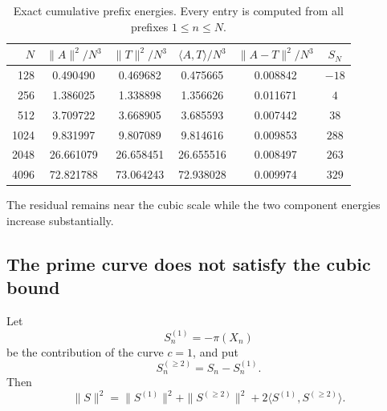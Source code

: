 \documentclass[11pt]{article}
\theoremstyle{definition}
\theoremstyle{remark}
\newcommand{\1}{\mathbf{1}}
\begin{document}
\begin{table}[htbp]
\centering
\caption{Exact cumulative prefix energies.  Every entry is computed
from all prefixes $1\le n\le N$.}
\label{tab:prefix-energy-numerical}
\scriptsize
\setlength{\tabcolsep}{4.2pt}
\begin{tabular}{rccccc}
\toprule
$N$ &
$\|A\|^2/N^3$ &
$\|T\|^2/N^3$ &
$\langle A,T\rangle/N^3$ &
$\|A-T\|^2/N^3$ &
$S_N$\\
\midrule
128  & 0.490490 & 0.469682 & 0.475665 & 0.008842 & $-18$\\
256  & 1.386025 & 1.338898 & 1.356626 & 0.011671 & $4$\\
512  & 3.709722 & 3.668905 & 3.685593 & 0.007442 & $38$\\
1024 & 9.831997 & 9.807089 & 9.814616 & 0.009853 & $288$\\
2048 & 26.661079 & 26.658451 & 26.655516 & 0.008497 & $263$\\
4096 & 72.821788 & 73.064243 & 72.938028 & 0.009974 & $329$\\
\bottomrule
\end{tabular}
\end{table}

The residual remains near the cubic scale while the two component
energies increase substantially.

\subsection{The prime curve does not satisfy the cubic bound}

Let
\[
 S_n^{(1)}=-\pi(X_n)
\]
be the contribution of the curve $c=1$, and put
\[
 S_n^{(\ge2)}=S_n-S_n^{(1)}.
\]
Then
\begin{equation}
 \|S\|^2
 =
 \|S^{(1)}\|^2
 +
 \|S^{(\ge2)}\|^2
 +
 2\langle S^{(1)},S^{(\ge2)}\rangle.
 \label{eq:prime-rest-energy}
\end{equation}
\end{document}
